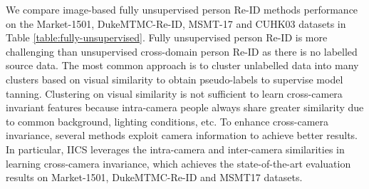 \documentclass[a4paper,fleqn]{cas-dc}
\begin{document}
\begin{table} [t]
\caption{Video-based fully unsupervised person Re-ID evaluation results.}
\label{table:video-based-evaluation}
\end{table}
We compare image-based fully unsupervised person Re-ID methods performance on the Market-1501, DukeMTMC-Re-ID, MSMT-17 and CUHK03 datasets in Table \ref{table:fully-unsupervised}. Fully unsupervised person Re-ID is more challenging than unsupervised cross-domain person Re-ID as there is no labelled source data. The most common approach is to cluster unlabelled data into many clusters based on visual similarity to obtain pseudo-labels to supervise model tanning. Clustering on visual similarity is not sufficient to learn cross-camera invariant features because intra-camera people always share greater similarity due to common background, lighting conditions, etc. To enhance cross-camera invariance, several methods exploit camera information to achieve better results. In particular, IICS leverages the intra-camera and inter-camera similarities in learning cross-camera invariance, which achieves the state-of-the-art evaluation results on Market-1501, DukeMTMC-Re-ID and MSMT17 datasets.  
\end{document}
